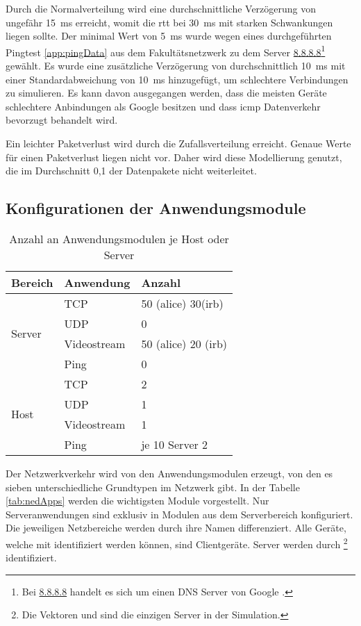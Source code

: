 Durch die Normalverteilung  wird eine durchschnittliche Verzögerung von ungefähr \SI{15}{\milli\second} erreicht, womit die \gls{rtt} bei \SI{30}{\milli\second} mit starken Schwankungen liegen sollte. Der minimal Wert von \SI{5}{\milli\second} wurde wegen eines durchgeführten Pingtest \ref{app:pingData} aus dem Fakultätsnetzwerk zu dem Server \url{8.8.8.8}\footnote{Bei \url{8.8.8.8} handelt es sich um einen DNS Server von Google \cite{GoogleDNS}. } gewählt. Es wurde eine zusätzliche Verzögerung von durchschnittlich \SI{10}{\milli\second} mit einer Standardabweichung von \SI{10}{\milli\second} hinzugefügt, um schlechtere Verbindungen zu simulieren. Es kann davon ausgegangen werden, dass die meisten Geräte schlechtere Anbindungen als Google besitzen und dass \gls{icmp} Datenverkehr bevorzugt behandelt wird.

Ein leichter Paketverlust wird durch die Zufallsverteilung  erreicht. Genaue Werte für einen Paketverlust liegen nicht vor. Daher wird diese Modellierung genutzt, die im Durchschnitt 0,1 \textperthousand{} der Datenpakete nicht weiterleitet.

\subsection{Konfigurationen der Anwendungsmodule}
\begin{table}[ht]
	\centering
	\begin{tabular}{|l|l|l|}
		\hline
		\rowcolor{Gainsboro!60}
		\hline
		Bereich                 & Anwendung   & Anzahl            \\ \hline
		\multirow{4}{*}{Server} & TCP         & 50 (alice) 30(irb) \\ \cline{2-3} 
		& UDP         & 0                 \\ \cline{2-3} 
		& Videostream &  50 (alice) 20 (irb)                \\ \cline{2-3} 
		& Ping        & 0                 \\ \hline
		\multirow{4}{*}{Host}   & TCP         & 2                 \\ \cline{2-3} 
		& UDP         & 1                 \\ \cline{2-3} 
		& Videostream & 1                 \\ \cline{2-3} 
		& Ping        & je 10 Server 2    \\ \hline
	\end{tabular}
	\caption{Anzahl an Anwendungsmodulen je Host oder Server}
	\label{tab:modulAnzahl}
\end{table}
Der Netzwerkverkehr wird von den Anwendungsmodulen erzeugt, von den es sieben unterschiedliche Grundtypen im Netzwerk gibt. In der Tabelle \ref{tab:nedApps} werden die wichtigsten Module vorgestellt. Nur Serveranwendungen sind exklusiv in Modulen aus dem Serverbereich konfiguriert. Die jeweiligen Netzbereiche werden durch ihre Namen differenziert. Alle Geräte, welche mit  identifiziert werden können, sind Clientgeräte. Server werden durch \footnote{Die Vektoren  und  sind die einzigen Server in der Simulation.} identifiziert. 

